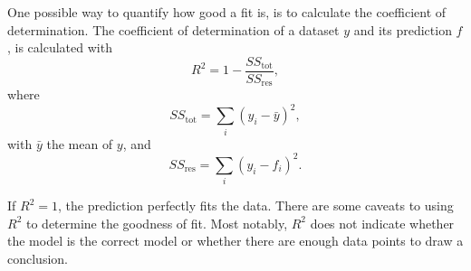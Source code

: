 One possible way to quantify how good a fit is, is to calculate the coefficient of determination.
The coefficient of determination of a dataset $y$ and its prediction $f$, is calculated with
\begin{equation}
    R^2 = 1 - \frac{SS_\mathrm{tot}}{SS_\mathrm{res}},
\end{equation}
where
\begin{equation}
    SS_\mathrm{tot} = \sum_i (y_i - \bar{y})^2,
\end{equation}
with $\bar{y}$ the mean of $y$, and
\begin{equation}
    SS_\mathrm{res} = \sum_i (y_i - f_i)^2.
\end{equation}

If $R^2 = 1$, the prediction perfectly fits the data.
There are some caveats to using $R^2$ to determine the goodness of fit.
Most notably, $R^2$ does not indicate whether the model is the correct model or whether there are enough data points to draw a conclusion.
